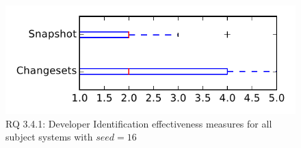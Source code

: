 
\begin{figure}
\centering
\includegraphics[height=0.4\textheight]{figures/dit_seed/rq1_tiny_16}
\caption{RQ 3.4.1: Developer Identification effectiveness measures for all subject systems with $seed=16$}
\label{fig:dit_seed:rq1:tiny}
\end{figure}
